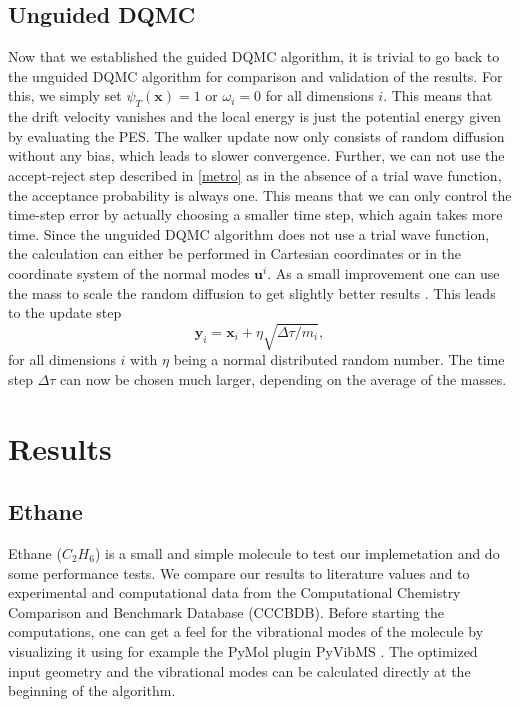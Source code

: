 \documentclass [12pt]{report}
\begin{document}
\section{Unguided DQMC} \label{uDQMC}
Now that we established the guided DQMC algorithm, it is trivial to go back to the unguided DQMC algorithm for comparison and validation of the results. For this, we simply set $\psi_T(\bm{x}) = 1$ or $\omega_i = 0$ for all dimensions $i$. This means that the drift velocity vanishes and the local energy is just the potential energy given by evaluating the PES. The walker update now only consists of random diffusion without any bias, which leads to slower convergence. Further, we can not use the accept-reject step described in \ref{metro} as in the absence of a trial wave function, the acceptance probability is always one. This means that we can only control the time-step error by actually choosing a smaller time step, which again takes more time. Since the unguided DQMC algorithm does not use a trial wave function, the calculation can either be performed in Cartesian coordinates or in the coordinate system of the normal modes $\bm{u}^i$. As a small improvement one can use the mass to scale the random diffusion to get slightly better results \cite{mccoy}. This leads to the update step
\begin{equation}
\bm{y}_i = \bm{x}_i + \eta\sqrt{\Delta \tau/m_i},
\end{equation}
for all dimensions $i$ with $\eta$ being a normal distributed random number. The time step $\Delta \tau$ can now be chosen much larger, depending on the average of the masses.

\chapter{Results}

\section{Ethane}

Ethane ($C_2H_6$) is a small and simple molecule to test our implemetation and do some performance tests. We compare our results to literature values\cite{c2h6} and to experimental and computational data from the Computational Chemistry Comparison and Benchmark Database (CCCBDB)\cite{cccbdb}. Before starting the computations, one can get a feel for the vibrational modes of the molecule by visualizing it using for example the PyMol plugin PyVibMS \cite{PyVibMS}. The optimized input geometry and the vibrational modes can be calculated directly at the beginning of the algorithm. 
\end{document}
